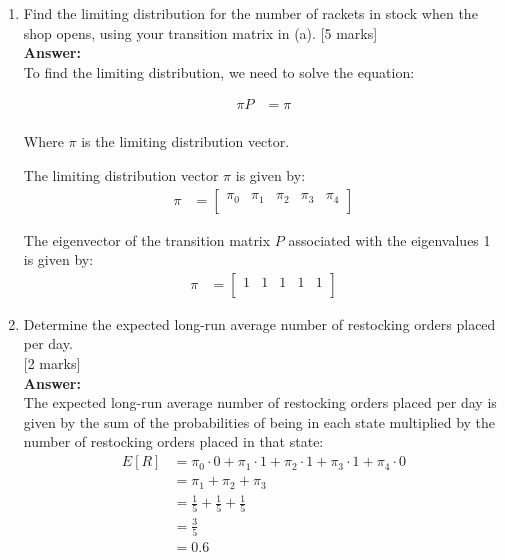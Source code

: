 \documentclass[12pt]{article}
\begin{document}
\begin{enumerate}
\begin{enumerate}
\item Find the limiting distribution for the number of rackets in stock when the shop opens, using your transition matrix in (a). 
			\hfill [5 marks]
%
\\
\textbf{Answer:}
\\
To find the limiting distribution, we need to solve the equation:

\begin{align*}
\pi P &= \pi \\
\end{align*}

Where $\pi$ is the limiting distribution vector.

The limiting distribution vector $\pi$ is given by:
\begin{align*}
\pi &= \begin{bmatrix}
\pi_0 & \pi_1 & \pi_2 & \pi_3 & \pi_4 \\
\end{bmatrix}
\end{align*}

The eigenvector of the transition matrix $P$ associated with the eigenvalues 1 is given by:
\begin{align*}
\pi &= 
\begin{bmatrix}
1 & 1 & 1 & 1 & 1 \\
\end{bmatrix}
\end{align*}

\item Determine the expected long-run average number of restocking orders placed per day. 
			\\\phantom{1}\hfill [2 marks]
%
\\
\textbf{Answer:}
\\
The expected long-run average number of restocking orders placed per day is given by the sum of the probabilities of being in each state multiplied by the number of restocking orders placed in that state:
\begin{align*}
E[R] &= \pi_0 \cdot 0 + \pi_1 \cdot 1 + \pi_2 \cdot 1 + \pi_3 \cdot 1 + \pi_4 \cdot 0 \\
&= \pi_1 + \pi_2 + \pi_3 \\
&= \frac{1}{5} + \frac{1}{5} + \frac{1}{5} \\
&= \frac{3}{5} \\
&= 0.6 \\
\end{align*}



\end{enumerate}
\end{enumerate}
\end{document}
